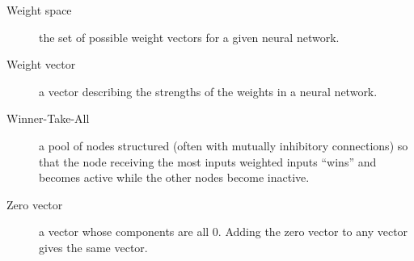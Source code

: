 \begin{description}
\item[Weight space] the set of possible weight vectors for a given neural network.

\item[Weight vector] a vector describing the strengths of the weights in a neural network.

\item[Winner-Take-All] a pool of nodes structured (often with mutually inhibitory connections) so that the node receiving the most inputs weighted inputs ``wins'' and becomes active while the other nodes become inactive.

\item[Zero vector] a vector whose components are all $0$. Adding the zero vector to any vector gives the same vector.

\end{description}


